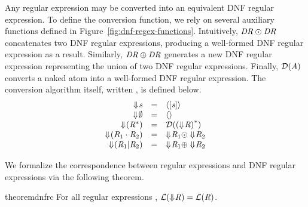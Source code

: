 \documentclass[numbers,10pt,preprint\ifanon ,nocopyrightspace\fi]{sigplanconf}
\begin{document}
Any regular expression may be converted into an equivalent DNF regular expression.  
To define the conversion function, we rely on several auxiliary functions defined in 
Figure~\ref{fig:dnf-regex-functions}.  Intuitively, $\mathit{DR}{} \odot \mathit{DR}{}$ concatenates
two DNF regular expressions, producing a well-formed DNF regular expression as a result.
Similarly, $\mathit{DR}{} \oplus{} \mathit{DR}{}$ generates a new DNF regular expression representing the
union of two DNF regular expressions.  Finally, $\mathcal{D}{(\mathit{A})}$ converts a naked atom into a
well-formed DNF regular expression.
The conversion algorithm itself, written  \ToDNFRegex{\Regex}, is defined below.
\[
  \begin{array}{rcl}
    \ToDNFRegexOf{\String} & = & \DNFOf{\SequenceOf{\String}}\\
    \ToDNFRegexOf{\emptyset} & = & \DNFOf{}\\
    \ToDNFRegexOf{(\StarOf{\Regex})} & = & \AtomToDNFOf{\StarOf{(\ToDNFRegexOf{\Regex})}}\\
    \ToDNFRegexOf{(\RegexConcat{\Regex_1}{\Regex_2})} & = & \ToDNFRegexOf{\Regex_1} \ConcatDNF \ToDNFRegexOf{\Regex_2}\\
    \ToDNFRegexOf{(\RegexOr{\Regex_1}{\Regex_2})} & = & \ToDNFRegexOf{\Regex_1} \OrDNF \ToDNFRegexOf{\Regex_2}\\
  \end{array}
\]

\iffull
\noindent
We formalize the correspondence between regular expressions and
DNF regular expressions via the following theorem.
\fi

\begin{restatable}{theorem}{dnfrc}
  \label{thm:completeness-dnf-lenses}
  For all regular expressions \Regex{},
  $\mathcal{L}(\Downarrow\mkern-4mu \mathit{R})=\mathcal{L}(\mathit{R}{})$.
\end{restatable}
\end{document}
